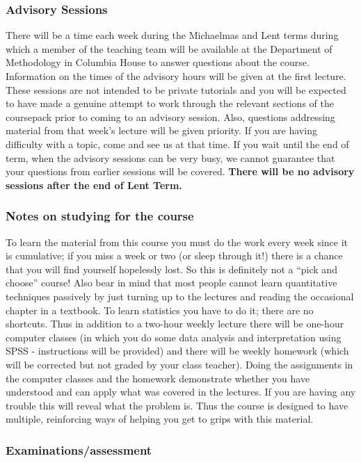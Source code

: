 \subsubsection{Advisory Sessions}
There will be a time each week during the Michaelmas and Lent terms during which a
member of the teaching team will be available at the Department of
Methodology in Columbia House to answer
questions about the course. Information on the times of the advisory
hours will be given at the first lecture. These sessions are not
intended to be private tutorials and you will be expected to have made a
genuine attempt to work through the relevant sections of the coursepack
prior to coming to an advisory session. Also, questions addressing
material from that week's lecture will be given priority.  If you are
having difficulty with a topic, come and see us at that time. If you
wait until the end of term, when the advisory sessions can be very busy,
we cannot guarantee that your questions from earlier sessions will be
covered.  \textbf{There will be no advisory sessions after the end of
Lent Term.}

\subsubsection{Notes on studying for the course}
To learn the material from this course you must do the work every week
since it is cumulative; if you miss a week or two (or sleep through it!)
there is a chance that you will find yourself hopelessly lost. So this
is definitely not a ``pick and choose'' course!  Also bear in mind that
most people cannot learn quantitative techniques passively by just
turning up to the lectures and reading the occasional chapter in a
textbook.  To learn statistics you have to do it; there are no
shortcuts. Thus in addition to a two-hour weekly lecture there will be
one-hour computer classes (in which you do some data analysis and
interpretation using SPSS - instructions will be provided) and there
will be weekly homework (which will be corrected but not graded by your
class teacher). Doing the assignments in the computer classes and the
homework demonstrate whether you have understood and can apply what was
covered in the lectures.  If you are having any trouble this will reveal
what the problem is.  Thus the course is designed to have multiple,
reinforcing ways of helping you get to grips with this material.


\subsubsection{Examinations/assessment}


